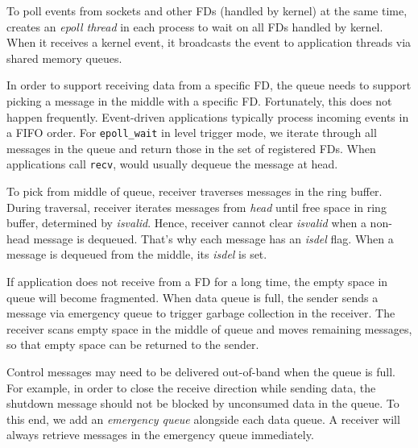 To poll events from sockets and other FDs (handled by kernel) at the same time, \libipc{} creates an \textit{epoll thread} in each process to wait on all FDs handled by kernel. When it receives a kernel event, it broadcasts the event to application threads via shared memory queues. %

In order to support receiving data from a specific FD, the queue needs to support picking a message in the middle with a specific FD.
Fortunately, this does not happen frequently. Event-driven applications typically process incoming events in a FIFO order. For \texttt{epoll\_wait} in level trigger mode, we iterate through all messages in the queue and return those in the set of registered FDs. When applications call \texttt{recv}, \libipc{} would usually dequeue the message at head.

To pick from middle of queue, receiver traverses messages in the ring buffer. During traversal, receiver iterates messages from \textit{head} until free space in ring buffer, determined by \textit{isvalid}. Hence, receiver cannot clear \textit{isvalid} when a non-head message is dequeued. That's why each message has an \textit{isdel} flag. When a message is dequeued from the middle, its \textit{isdel} is set. %

If application does not receive from a FD for a long time, the empty space in queue will become fragmented.
When data queue is full, the sender sends a message via emergency queue to trigger garbage collection in the receiver.
The receiver scans empty space in the middle of queue and moves remaining messages, so that empty space can be returned to the sender.

Control messages may need to be delivered out-of-band when the queue is full. For example, in order to close the receive direction while sending data, the shutdown message should not be blocked by unconsumed data in the queue. To this end, we add an \textit{emergency queue} alongside each data queue.
A receiver will always retrieve messages in the emergency queue immediately.
\fi


